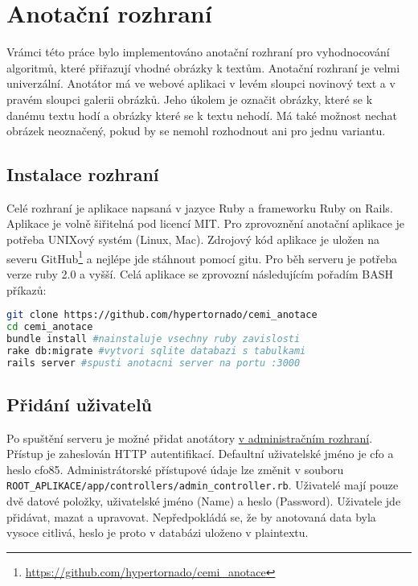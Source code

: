 \chapter{Anotační rozhraní}
\label{chap:rozhrani}

Vrámci této práce bylo implementováno anotační rozhraní pro vyhodnocování algoritmů, které přiřazují vhodné obrázky k textům. Anotační rozhraní je velmi univerzální. Anotátor má ve webové aplikaci v levém sloupci novinový text a v pravém sloupci galerii obrázků. Jeho úkolem je označit obrázky, které se k danému textu hodí a obrázky které se k textu nehodí. Má také možnost nechat obrázek neoznačený, pokud by se nemohl rozhodnout ani pro jednu variantu.

\section{Instalace rozhraní}

Celé rozhraní je aplikace napsaná v jazyce Ruby a frameworku Ruby on Rails. Aplikace je volně šiřitelná pod licencí MIT. Pro zprovoznění anotační aplikace je potřeba UNIXový systém (Linux, Mac). Zdrojový kód aplikace je uložen na severu GitHub\footnote{\url{https://github.com/hypertornado/cemi_anotace}} a nejlépe jde stáhnout pomocí gitu. Pro běh serveru je potřeba verze ruby 2.0 a vyšší. Celá aplikace se zprovozní následujícím pořadím BASH příkazů:

\begin{lstlisting}[language=bash]
git clone https://github.com/hypertornado/cemi_anotace
cd cemi_anotace
bundle install #nainstaluje vsechny ruby zavislosti
rake db:migrate #vytvori sqlite databazi s tabulkami
rails server #spusti anotacni server na portu :3000
\end{lstlisting}

\section{Přidání uživatelů}

Po spuštění serveru je možné přidat anotátory \href{http://localhost:3000/users}{v administračním rozhraní}. Přístup je zaheslován HTTP autentifikací. Defaultní uživatelské jméno je cfo a heslo cfo85. Administrátorské přístupové údaje lze změnit v souboru \lstinline{ROOT_APLIKACE/app/controllers/admin_controller.rb}. Uživatelé mají pouze dvě datové položky, uživatelské jméno (Name) a heslo (Password). Uživatele jde přidávat, mazat a upravovat. Nepředpokládá se, že by anotovaná data byla vysoce citlivá, heslo je proto v databázi uloženo v plaintextu.

